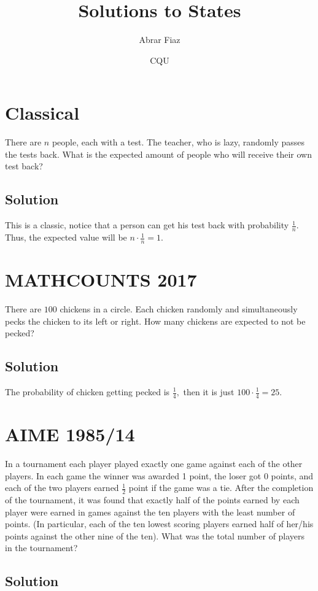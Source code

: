 \documentclass{article}
\title{Solutions to States}
\author{Abrar Fiaz}
\date{CQU}
\begin{document}
\maketitle

\toc


\pagebreak\section{Classical} 
There are $n$ people, each with a test. The teacher, who is lazy, randomly passes the tests back. What is the expected amount of people who will receive their own test back?
\subsection{Solution}
This is a classic, notice that a person can get his test back with probability $\frac1n$. Thus, the expected value will be $n\cdot\frac1n = 1.$ 
	


\pagebreak\section{MATHCOUNTS 2017} There are $100$ chickens in a circle. Each chicken randomly and simultaneously pecks the chicken to its left or right. How many chickens are expected to not be pecked?
\subsection{Solution}
The probability of chicken getting pecked is $\frac14,$ then it is just $100\cdot\frac14=25.$



\pagebreak\section{AIME 1985/14} In a tournament each player played exactly one game against each of the other players. In each game the winner was awarded 1 point, the loser got 0 points, and each of the two players earned $\frac{1}{2}$ point if the game was a tie. After the completion of the tournament, it was found that exactly half of the points earned by each player were earned in games against the ten players with the least number of points. (In particular, each of the ten lowest scoring players earned half of her/his points against the other nine of the ten). What was the total number of players in the tournament?
\subsection{Solution}
\end{document}
